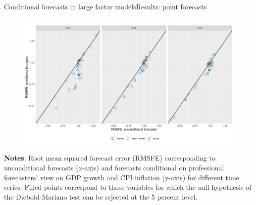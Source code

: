 \documentclass[xcolor=svgnames, 10pt, aspectratio=169]{beamer}
\begin{document}
\begin{frame}{Conditional forecasts in large factor models}{Results: point forecasts}
    \begin{figure}
        \includegraphics[scale = 0.4]{fig_eval_rmsfe.pdf}  \vspace{0.1cm} \\
    \end{figure}

    \begin{adjustbox}{minipage=0.8\textwidth,center}
        {\tiny \textbf{Notes}: Root mean squared forecast error (RMSFE) corresponding to unconditional forecasts (x-axis) and forecasts conditional on professional forecasters’ view on GDP growth and CPI inflation (y-axis) for different time series. Filled points correspond to those variables for which the null hypothesis of the Diebold-Mariano test can be rejected at the 5 percent level.}\par
\end{adjustbox} 
\end{frame}
\end{document}
